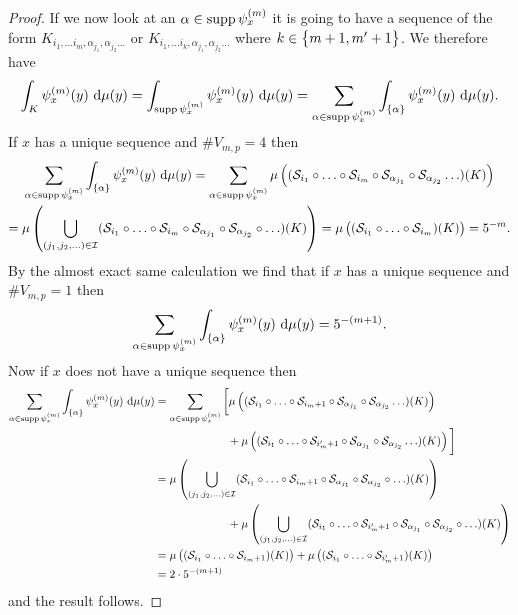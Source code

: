 \begin{proof}
If we now look at an $\alpha \in \operatorname{supp} \psi_x^{(m)}$ it is going to have a sequence of the form $K_{i_1, \ldots i_m, \alpha_{j_1}, \alpha_{j_2} \ldots}$ or $K_{i_1, \ldots i_k, \alpha_{j_1}, \alpha_{j_2} \ldots}$ where $k \in \cbr{m+1, m'+1}$. We therefore have
\begin{equation}
	\int_{K} \psi_{x}^{(m)}(y) \dd \mu(y) = \int_{\supp \psi_{x}^{(m)}} \psi_{x}^{(m)}(y) \dd \mu(y) = \sum_{\alpha \in \supp \psi_{x}^{(m)}} \int_{\cbr{\alpha}} \psi_{x}^{(m)}(y) \dd \mu(y).
\end{equation}
 If $x$ has a unique sequence and $\# V_{m,p} = 4$ then
\begin{multline}
	\sum_{\alpha \in \supp \psi_{x}^{(m)}} \int_{\cbr{\alpha}} \psi_{x}^{(m)}(y) \dd \mu(y) = \sum_{\alpha \in \supp \psi_{x}^{(m)}} \mu\left((\fracConst_{i_1} \circ \ldots \circ \fracConst_{i_m} \circ \fracConst_{\alpha_{j_1}} \circ \fracConst_{\alpha_{j_2}} \ldots)(K) \right) \\
	= \mu\left(\bigcup_{(j_1, j_2, \ldots) \in \mathcal{I}} (\fracConst_{i_1} \circ \ldots \circ \fracConst_{i_m} \circ \fracConst_{\alpha_{j_1}} \circ \fracConst_{\alpha_{j_2}} \circ \ldots)(K)\right) = \mu \left((\fracConst_{i_1} \circ \ldots \circ \fracConst_{i_m})(K)\right) = 5^{-m}.
\end{multline}
By the almost exact same calculation we find that if $x$ has a unique sequence and $\# V_{m,p} = 1$ then 
\begin{equation}
	\sum_{\alpha \in \supp \psi_{x}^{(m)}} \int_{\cbr{\alpha}} \psi_{x}^{(m)}(y) \dd \mu(y) = 5^{-(m+1)}.
\end{equation}
Now if $x$ does not have a unique sequence then
\begin{align}
		\sum_{\alpha \in \supp \psi_{x}^{(m)}} \int_{\cbr{\alpha}} \psi_{x}^{(m)}(y) \dd \mu(y) &= \sum_{\alpha \in \supp \psi_{x}^{(m)}} \bigg[ \mu\left((\fracConst_{i_1} \circ \ldots \circ \fracConst_{i_m+1} \circ \fracConst_{\alpha_{j_1}} \circ \fracConst_{\alpha_{j_2}} \ldots)(K) \right) \\
		&\phantom{a} \qquad \qquad \qquad + \mu\left((\fracConst_{i_1} \circ \ldots \circ \fracConst_{i_m'+1} \circ \fracConst_{\alpha_{j_1}} \circ \fracConst_{\alpha_{j_2}} \ldots)(K) \right) \bigg] \\
		&= \mu\left(\bigcup_{(j_1, j_2, \ldots) \in \mathcal{I}} (\fracConst_{i_1} \circ \ldots \circ \fracConst_{i_m+1} \circ \fracConst_{\alpha_{j_1}} \circ \fracConst_{\alpha_{j_2}} \circ \ldots)(K)\right)\\
		&\phantom{a} \qquad \qquad \qquad + \mu\left(\bigcup_{(j_1, j_2, \ldots) \in \mathcal{I}} (\fracConst_{i_1} \circ \ldots \circ \fracConst_{i_m'+1} \circ \fracConst_{\alpha_{j_1}} \circ \fracConst_{\alpha_{j_2}} \circ \ldots)(K)\right) \\
		&= \mu \left((\fracConst_{i_1} \circ \ldots \circ \fracConst_{i_m+1})(K)\right) + \mu \left((\fracConst_{i_1} \circ \ldots \circ \fracConst_{i_m'+1})(K)\right)\\
		&= 2\cd 5^{-(m+1)}
\end{align}
and the result follows.
\end{proof}
